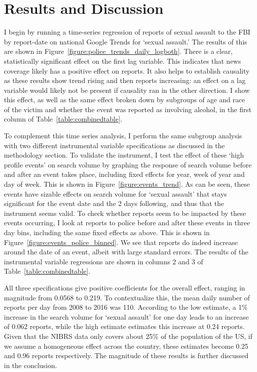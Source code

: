 \documentclass[AER,draftmode]{AEA}
\begin{document}
\section{Results and Discussion}
I begin by running a time-series regression of reports of sexual assault to the FBI by report-date on national Google Trends for `sexual assault.' The results of this are shown in Figure~\ref{figure:police_trends_daily_logboth}. There is a clear, statistically significant effect on the first lag variable. This indicates that news coverage likely has a positive effect on reports. It also helps to establish causality as these results show trend rising and then reports increasing: an effect on a lag variable would likely not be present if causality ran in the other direction. I show this effect, as well as the same effect broken down by subgroups of age and race of the victim and whether the event was reported as involving alcohol, in the first column of Table~\ref{table:combinedtable}. 

To complement this time series analysis, I perform the same subgroup analysis with two different instrumental variable specifications as discussed in the methodology section. To validate the instrument, I test the effect of these `high profile events' on search volume by graphing the response of search volume before and after an event takes place, including fixed effects for year, week of year and day of week. This is shown in Figure~\ref{figure:events_trend}. As can be seen, these events have sizable effects on search volume for `sexual assault' that stays significant for the event date and the 2 days following, and thus that the instrument seems valid. To check whether reports seem to be impacted by these events occurring, I look at reports to police before and after these events in three day bins, including the same fixed effects as above. This is shown in Figure~\ref{figure:events_police_binned}. We see that reports do indeed increase around the date of an event, albeit with large standard errors.  The results of the instrumental variable regressions are shown in columns 2 and 3 of Table~\ref{table:combinedtable}. 

All three specifications give positive coefficients for the overall effect, ranging in magnitude from 0.0568 to 0.219. To contextualize this, the mean daily number of reports per day from 2008 to 2016 was 110. According to the low estimate, a 1\% increase in the search volume for `sexual assault' for one day leads to an increase of 0.062 reports, while the high estimate estimates this increase at 0.24 reports. Given that the NIBRS data only covers about 25\% of the population of the US, if we assume a homogeneous effect across the country, these estimates become 0.25 and 0.96 reports respectively. The magnitude of these results is further discussed in the conclusion.
\end{document}
